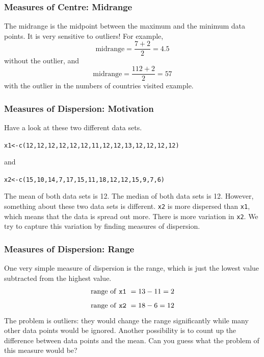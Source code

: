 \documentclass[xcolor=dvipsnames]{beamer}
\begin{document}
\begin{frame}
  \frametitle{Measures of Centre: Midrange}
The \alert{midrange} is the midpoint between the maximum and the
minimum data points. It is very sensitive to outliers! For example,
\begin{equation}
  \label{eq:nahjuise}
  \mbox{midrange}=\frac{7+2}{2}=4.5
\end{equation}
without the outlier, and
\begin{equation}
  \label{eq:foofieng}
  \mbox{midrange}=\frac{112+2}{2}=57
\end{equation}
with the outlier in the numbers of countries visited example.
\end{frame}

\begin{frame}
  \frametitle{Measures of Dispersion: Motivation}
Have a look at these two different data sets.
\begin{alltt}
x1<-c(12,12,12,12,12,12,11,12,12,13,12,12,12,12)
\end{alltt}
and
\begin{alltt}
x2<-c(15,10,14,7,17,15,11,18,12,12,15,9,7,6)
\end{alltt}
The mean of both data sets is 12. The median of both data sets is 12.
However, something about these two data sets is different. \texttt{x2}
is more dispersed than \texttt{x1}, which means that the data is
spread out more. There is more variation in \texttt{x2}. We try to
capture this variation by finding measures of dispersion.
\end{frame}

\begin{frame}
  \frametitle{Measures of Dispersion: Range}
One very simple measure of dispersion is the \alert{range}, which is
just the lowest value subtracted from the highest value. 
\begin{equation}
  \label{eq:ungoliex}
  \mbox{range of \texttt{x1} }=13-11=2
\end{equation}
\begin{equation}
  \label{eq:aengoore}
  \mbox{range of \texttt{x2} }=18-6=12
\end{equation}
The problem is outliers: they would change the range significantly
while many other data points would be ignored. Another possibility is
to count up the difference between data points and the mean. Can you
guess what the problem of this measure would be?
\end{frame}
\end{document}
